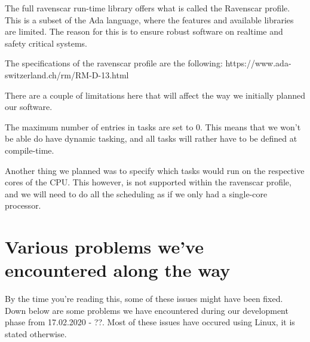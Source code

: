\documentclass{article}
\begin{document}
The full ravenscar run-time library offers what is called the Ravenscar profile. This is a subset of the Ada language, where the features and available libraries are limited. The reason for this is to ensure robust software on realtime and safety critical systems. 

The specifications of the ravenscar profile are the following:
https://www.ada-switzerland.ch/rm/RM-D-13.html

There are a couple of limitations here that will affect the way we initially planned our software. 

The maximum number of entries in tasks are set to 0. This means that we won't be able do have dynamic tasking, and all tasks will rather have to be defined at compile-time. 

Another thing we planned was to specify which tasks would run on the respective cores of the CPU. This however, is not supported within the ravenscar profile, and we will need to do all the scheduling as if we only had a single-core processor. 

\section{Various problems we've encountered along the way}

By the time you're reading this, some of these issues might have been fixed. Down below are some problems we have encountered during our development phase from 17.02.2020 - ??. Most of these issues have occured using Linux, it is stated otherwise.
\end{document}
